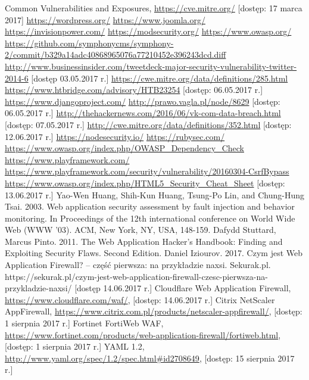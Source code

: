 \documentclass[11pt,a4paper,polish,thesis,oneside]{dcsbook}
\begin{document}
\begin{thebibliography}{1}
 Common Vulnerabilities and Exposures, \url{https://cve.mitre.org/} [dostęp: 17 marca 2017]
 \url{https://wordpress.org/}
 \url{https://www.joomla.org/}
 \url{https://invisionpower.com/}
 \url{https://modsecurity.org/}
\url{ https://www.owasp.org/}
 \url{https://github.com/symphonycms/symphony-2/commit/b329a14adc40868965076a77210452e396243dcd.diff}
 \url{http://www.businessinsider.com/tweetdeck-major-security-vulnerability-twitter-2014-6} [dostęp 03.05.2017 r.]
 \url{https://cwe.mitre.org/data/definitions/285.html}
 \url{https://www.htbridge.com/advisory/HTB23254} [dostęp: 06.05.2017 r.]
 \url{https://www.djangoproject.com/}
 \url{http://prawo.vagla.pl/node/8629} [dostęp: 06.05.2017 r.]
 \url{http://thehackernews.com/2016/06/vk-com-data-breach.html} [dostęp: 07.05.2017 r.]
 \url{http://cwe.mitre.org/data/definitions/352.html} [dostęp: 12.06.2017 r.]
 \url{https://nodesecurity.io/}
 \url{https://rubysec.com/}
 \url{https://www.owasp.org/index.php/OWASP\_Dependency\_Check}
 \url{https://www.playframework.com/}
 \url{https://www.playframework.com/security/vulnerability/20160304-CsrfBypass}
 \url{https://www.owasp.org/index.php/HTML5\_Security\_Cheat\_Sheet} [dostęp: 13.06.2017 r.]
 Yao-Wen Huang, Shih-Kun Huang, Tsung-Po Lin, and Chung-Hung Tsai. 2003. Web application security assessment by fault injection and behavior monitoring. In Proceedings of the 12th international conference on World Wide Web (WWW '03). ACM, New York, NY, USA, 148-159.
 Dafydd Stuttard, Marcus Pinto. 2011. The Web Application Hacker's Handbook: Finding and Exploiting Security Flaws. Second Edition.
 Daniel Iziourov. 2017. Czym jest Web Application Firewall? – część pierwsza: na przykładzie naxsi. Sekurak.pl. https://sekurak.pl/czym-jest-web-application-firewall-czesc-pierwsza-na-przykladzie-naxsi/ [dostęp 14.06.2017 r.]
 Cloudflare Web Application Firewall, \url{https://www.cloudflare.com/waf/}, [dostęp: 14.06.2017 r.]
 Citrix NetScaler AppFirewall, \url{https://www.citrix.com.pl/products/netscaler-appfirewall/}, [dostęp: 1 sierpnia 2017 r.]
 Fortinet FortiWeb WAF, \url{https://www.fortinet.com/products/web-application-firewall/fortiweb.html}, [dostęp: 1 sierpnia 2017 r.]
 YAML 1.2, \url{http://www.yaml.org/spec/1.2/spec.html#id2708649}, [dostęp: 15 sierpnia 2017 r.]
\end{thebibliography}
\end{document}
